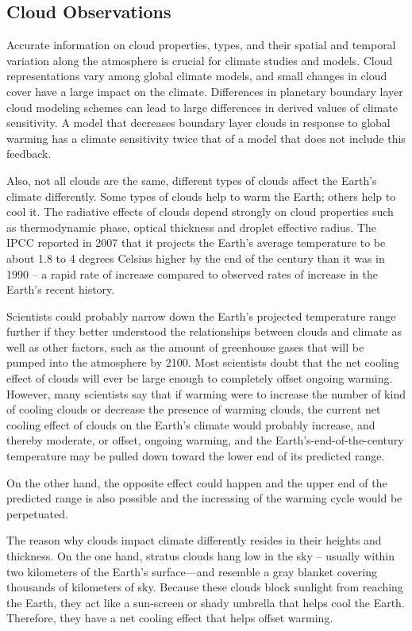 \documentclass{scrartcl}
\begin{document}
\subsection{Cloud Observations}
\label{sec:org850e761}


Accurate information on cloud properties, types, and their spatial and temporal
variation along the atmosphere is crucial for climate studies and models. Cloud
representations vary among global climate models, and small changes in cloud
cover have a large impact on the climate. Differences in planetary boundary
layer cloud modeling schemes can lead to large differences in derived values of
climate sensitivity. A model that decreases boundary layer clouds in response to
global warming has a climate sensitivity twice that of a model that does not
include this feedback.

Also, not all clouds are the same, different types of clouds affect the Earth’s
climate differently. Some types of clouds help to warm the Earth; others help
to cool it. The radiative effects of clouds depend strongly on cloud properties
such as thermodynamic phase, optical thickness and droplet effective radius.
The IPCC reported in 2007 that it projects the Earth’s average temperature to
be about 1.8 to 4 degrees Celsius higher by the end of the century than it was
in 1990 – a rapid rate of increase compared to observed rates of increase in
the Earth’s recent history.

Scientists could probably narrow down the Earth’s projected temperature range
 further if they better understood the relationships between clouds and climate
 as well as other factors, such as the amount of greenhouse gases that will be
 pumped into the atmosphere by 2100. Most scientists doubt that the net cooling
 effect of clouds will ever be large enough to completely offset ongoing warming.
 However, many scientists \citep{marshak} say that if warming were to increase the number
 of kind of cooling clouds or decrease the presence of warming clouds, the current net
cooling effect of clouds on the Earth’s climate would probably increase, and
thereby moderate, or offset, ongoing warming, and the Earth’s-end-of-the-century
temperature may be pulled down toward the lower end of its predicted range.

On the other hand, the opposite effect could happen and the upper end of the
predicted range is also possible and the increasing of the warming cycle would
be perpetuated.

The reason why clouds impact climate differently resides in their heights and
thickness. On the one hand, stratus clouds hang low in the sky – usually within
two kilometers of the Earth’s surface—and resemble a gray blanket covering
thousands of kilometers of sky. Because these clouds block sunlight from reaching
the Earth, they act like a sun-screen or shady umbrella that helps cool the Earth.
Therefore, they have a net cooling effect that helps offset warming.
\end{document}
